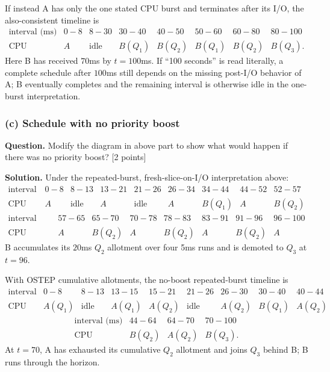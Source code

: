 If instead A has only the one stated CPU burst and terminates after its I/O,
the also-consistent timeline is
\[
\begin{array}{c|rrrrrrr}
\text{interval (ms)}
&0\!-\!8&8\!-\!30&30\!-\!40&40\!-\!50&50\!-\!60&60\!-\!80&80\!-\!100\\
\hline
\text{CPU}
&A&\text{idle}&B(Q_1)&B(Q_2)&B(Q_1)&B(Q_2)&B(Q_3).
\end{array}
\]
Here B has received \(70\)ms by \(t=100\)ms.  If ``100 seconds'' is read
literally, a complete schedule after \(100\)ms still depends on the missing
post-I/O behavior of A; B eventually completes and the remaining interval is
otherwise idle in the one-burst interpretation.

\subsubsection*{(c) Schedule with no priority boost}
\textbf{Question.} Modify the diagram in above part to show what would happen
if there was no priority boost? \hfill [2 points]

\textbf{Solution.}
Under the repeated-burst, fresh-slice-on-I/O interpretation above:
\[
\begin{array}{c|rrrrrrrr}
\text{interval (ms)}
&0\!-\!8&8\!-\!13&13\!-\!21&21\!-\!26&26\!-\!34&34\!-\!44
&44\!-\!52&52\!-\!57\\ \hline
\text{CPU}
&A&\text{idle}&A&\text{idle}&A&B(Q_1)&A&B(Q_2)
\end{array}
\]
\[
\begin{array}{c|rrrrrrr}
\text{interval (ms)}
&57\!-\!65&65\!-\!70&70\!-\!78&78\!-\!83&83\!-\!91&91\!-\!96
&96\!-\!100\\ \hline
\text{CPU}
&A&B(Q_2)&A&B(Q_2)&A&B(Q_2)&A
\end{array}
\]
B accumulates its \(20\)ms \(Q_2\) allotment over four 5ms runs and is demoted
to \(Q_3\) at \(t=96\).

With OSTEP cumulative allotments, the no-boost repeated-burst timeline is
\[
\begin{array}{c|rrrrrrrr}
\text{interval (ms)}
&0\!-\!8&8\!-\!13&13\!-\!15&15\!-\!21&21\!-\!26&26\!-\!30
&30\!-\!40&40\!-\!44\\ \hline
\text{CPU}
&A(Q_1)&\text{idle}&A(Q_1)&A(Q_2)&\text{idle}&A(Q_2)
&B(Q_1)&A(Q_2)
\end{array}
\]
\[
\begin{array}{c|rrr}
\text{interval (ms)}&44\!-\!64&64\!-\!70&70\!-\!100\\ \hline
\text{CPU}&B(Q_2)&A(Q_2)&B(Q_3).
\end{array}
\]
At \(t=70\), A has exhausted its cumulative \(Q_2\) allotment and joins
\(Q_3\) behind B; B runs through the horizon.

